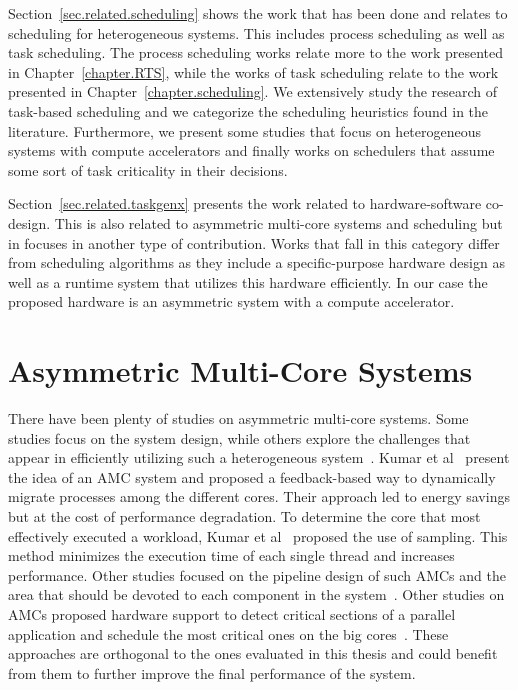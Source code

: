 Section~\ref{sec.related.scheduling} shows the work that has been done and relates to scheduling for heterogeneous systems.
This includes process scheduling as well as task scheduling. 
The process scheduling works relate more to the work presented in Chapter~\ref{chapter.RTS}, while the works of task scheduling relate to the work presented in Chapter~\ref{chapter.scheduling}.
We extensively study the research of task-based scheduling and we categorize the scheduling heuristics found in the literature. 
Furthermore, we present some studies that focus on heterogeneous systems with compute accelerators and finally works on schedulers that assume some sort of task criticality in their decisions.

Section~\ref{sec.related.taskgenx} presents the work related to hardware-software co-design. 
This is also related to asymmetric multi-core systems and scheduling but in focuses in another type of contribution.
Works that fall in this category differ from scheduling algorithms as they include a specific-purpose hardware design as well as a runtime system that utilizes this hardware efficiently.
In our case the proposed hardware is an asymmetric system with a compute accelerator.




\newpage













\section{Asymmetric Multi-Core Systems}
\label{sec.related.AMC}
There have been plenty of studies on asymmetric multi-core systems. 
Some studies focus on the system design, while others explore the challenges that appear in efficiently utilizing such a heterogeneous system~\cite{AMC_survey}.
Kumar et al~\cite{Kumar_micro_2003} present the idea of an AMC system and proposed a feedback-based way to dynamically migrate processes among the different cores. 
Their approach led to energy savings but at the cost of performance degradation. 
To determine the core that most effectively executed a workload, Kumar et al~\cite{Kumar:ISCA2004} proposed the use of sampling. 
This method minimizes the execution time of each single thread and increases performance. 
Other studies focused on the pipeline design of such AMCs and the area that should be devoted to each component in the system~\cite{Balakrishnan:ISCA2005, Morad_area_based}. 
Other studies on AMCs proposed hardware support to detect critical sections of a parallel application and schedule the most critical ones on the big cores~\cite{Suleman:APLOS2009, Joao:ASPLOS2012,Joao:ISCA2013}. 
These approaches are orthogonal to the ones evaluated in this thesis and could benefit from them to further improve the final performance of the system.



